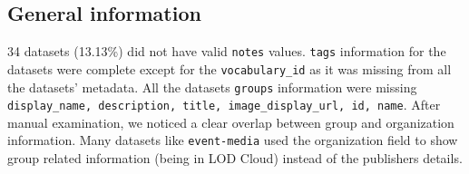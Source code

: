 \documentclass[runningheads,a4paper]{llncs}
\begin{document}
\subsection{General information} 34 datasets (13.13\%) did not have valid \texttt{notes} values. \texttt{tags} information for the datasets were complete except for the \texttt{vocabulary\_id} as it was missing from all the datasets' metadata. All the datasets \texttt{groups} information were missing \texttt{display\_name, description, title, image\_display\_url, id, name}. After manual examination, we noticed a clear overlap between group and organization information. Many datasets like \texttt{event-media} used the organization field to show group related information (being in LOD Cloud) instead of the publishers details.\\
\end{document}
